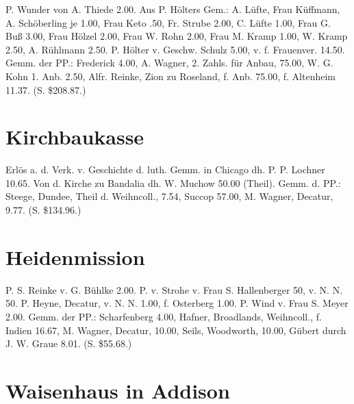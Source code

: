 P. Wunder von A. Thiede 2.00. Aus P. Hölters Gem.: A. Lüfte, Frau Küffmann, A. Schöberling je 1.00, Frau Keto .50, Fr. Strube 2.00, C. Lüfte 1.00, Frau G. Buß 3.00, Frau Hölzel 2.00, Frau W. Rohn 2.00, Frau M. Kramp 1.00, W. Kramp 2.50, A. Rühlmann 2.50. P. Hölter v. Geschw. Schulz 5.00, v. f. Frauenver. 14.50. Gemm. der PP.: Frederick 4.00, A. Wagner, 2. Zahls. für Anbau, 75.00, W. G. Kohn 1. Anb. 2.50, Alfr. Reinke, Zion zu Roseland, f. Anb. 75.00, f. Altenheim 11.37. (S. \$208.87.)

\section{Kirchbaukasse}

Erlös a. d. Verk. v. Geschichte d. luth. Gemm. in Chicago dh. P. P. Lochner 10.65. Von d. Kirche zu Bandalia dh. W. Muchow 50.00 (Theil). Gemm. d. PP.: Steege, Dundee, Theil d. Weihncoll., 7.54, Succop 57.00, M. Wagner, Decatur, 9.77. (S. \$134.96.)

\section{Heidenmission}

P. S. Reinke v. G. Bühlke 2.00. P. v. Strohe v. Frau S. Hallenberger 50, v. N. N. 50. P. Heyne, Decatur, v. N. N. 1.00, f. Osterberg 1.00. P. Wind v. Frau S. Meyer 2.00. Gemm. der PP.: Scharfenberg 4.00, Hafner, Broadlands, Weihncoll., f. Indien 16.67, M. Wagner, Decatur, 10.00, Seils, Woodworth, 10.00, Gübert durch J. W. Graue 8.01. (S. \$55.68.)

\section{Waisenhaus in Addison}

